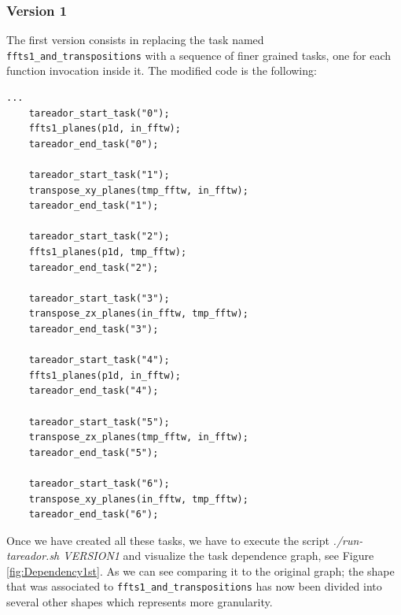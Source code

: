 \documentclass[12]{article}
\begin{document}
\subsubsection{Version 1}

The first version consists in replacing the task named \texttt{ffts1\_and\_transpositions} with a sequence of finer grained tasks, one for each function invocation inside it. The modified code is the following: 
\\
\begin{lstlisting}
...
    tareador_start_task("0");
    ffts1_planes(p1d, in_fftw);
    tareador_end_task("0");

    tareador_start_task("1");
    transpose_xy_planes(tmp_fftw, in_fftw);
    tareador_end_task("1");

    tareador_start_task("2");
    ffts1_planes(p1d, tmp_fftw);
    tareador_end_task("2");

    tareador_start_task("3");	
    transpose_zx_planes(in_fftw, tmp_fftw);
    tareador_end_task("3");
    
    tareador_start_task("4");
    ffts1_planes(p1d, in_fftw);
    tareador_end_task("4");

    tareador_start_task("5");
    transpose_zx_planes(tmp_fftw, in_fftw);
    tareador_end_task("5");

    tareador_start_task("6");
    transpose_xy_planes(in_fftw, tmp_fftw);
    tareador_end_task("6");
\end{lstlisting}

Once we have created all these tasks, we have to execute the script \textit{./run-tareador.sh VERSION1} and visualize the task dependence graph, see Figure \ref{fig:Dependency1st}. As we can see comparing it to the original graph; the shape that was associated to \texttt{ffts1\_and\_transpositions} has now been divided into several other shapes which represents more granularity. 
\end{document}
